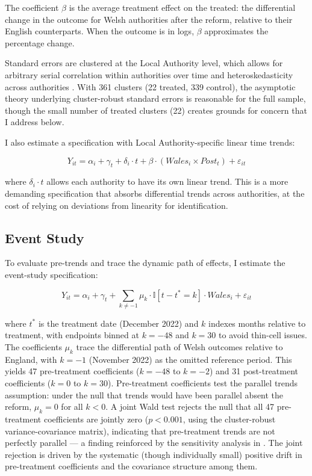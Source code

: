 \documentclass[12pt]{article}
\newcommand{\ind}{\mathbb{I}}
\begin{document}
The coefficient $\beta$ is the average treatment effect on the treated: the differential change in the outcome for Welsh authorities after the reform, relative to their English counterparts. When the outcome is in logs, $\beta$ approximates the percentage change.

Standard errors are clustered at the Local Authority level, which allows for arbitrary serial correlation within authorities over time and heteroskedasticity across authorities \citep{bertrand2004much}. With 361 clusters (22 treated, 339 control), the asymptotic theory underlying cluster-robust standard errors is reasonable for the full sample, though the small number of treated clusters (22) creates grounds for concern that I address below.

I also estimate a specification with Local Authority-specific linear time trends:

\begin{equation}
\label{eq:did_trends}
Y_{it} = \alpha_i + \gamma_t + \delta_i \cdot t + \beta \cdot (\mathit{Wales}_i \times \mathit{Post}_t) + \varepsilon_{it}
\end{equation}

\noindent where $\delta_i \cdot t$ allows each authority to have its own linear trend. This is a more demanding specification that absorbs differential trends across authorities, at the cost of relying on deviations from linearity for identification.

\subsection{Event Study}

To evaluate pre-trends and trace the dynamic path of effects, I estimate the event-study specification:

\begin{equation}
\label{eq:es}
Y_{it} = \alpha_i + \gamma_t + \sum_{k \neq -1} \mu_k \cdot \ind[t - t^* = k] \cdot \mathit{Wales}_i + \varepsilon_{it}
\end{equation}

\noindent where $t^*$ is the treatment date (December 2022) and $k$ indexes months relative to treatment, with endpoints binned at $k = -48$ and $k = 30$ to avoid thin-cell issues. The coefficients $\mu_k$ trace the differential path of Welsh outcomes relative to England, with $k = -1$ (November 2022) as the omitted reference period. This yields 47 pre-treatment coefficients ($k = -48$ to $k = -2$) and 31 post-treatment coefficients ($k = 0$ to $k = 30$). Pre-treatment coefficients test the parallel trends assumption: under the null that trends would have been parallel absent the reform, $\mu_k = 0$ for all $k < 0$. A joint Wald test rejects the null that all 47 pre-treatment coefficients are jointly zero ($p < 0.001$, using the cluster-robust variance-covariance matrix), indicating that pre-treatment trends are not perfectly parallel --- a finding reinforced by the sensitivity analysis in . The joint rejection is driven by the systematic (though individually small) positive drift in pre-treatment coefficients and the covariance structure among them.
\end{document}
